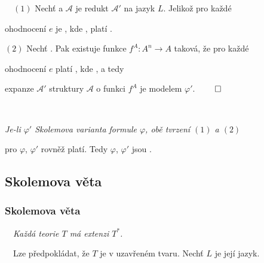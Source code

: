 {\it {}}\ \ $(1)$ Nechť  a $\mathcal{A}$ je redukt $\mathcal{A}'$ na jazyk $L$. Jelikož pro každé
\smallskip

ohodnocení $e$ je , kde , platí .
\smallskip

$(2)$ Nechť . Pak existuje funkce $f^{A}\colon A^n \to A$ taková, že pro každé
\smallskip

ohodnocení $e$ platí , kde , a tedy
\smallskip

expanze $\mathcal{A'}$ struktury $\mathcal{A}$ o funkci $f^{A}$ je modelem $\varphi'$. $\qed$
\medskip

{\bf {}}\ \ {\it Je-li $\varphi'$ Skolemova varianta formule $\varphi$, obě tvrzení $(1)$ a $(2)$
\smallskip

pro $\varphi$, $\varphi'$ rovněž platí. Tedy $\varphi$, $\varphi'$ jsou .}



\subsection{Skolemova věta}\todo

\subsubsection*{Skolemova věta}
    
    {\bf {}}\ \ {\it Každá teorie $T$ má  extenzi $T^*$.}
    \medskip
    
    {\it {}}\ \ Lze předpokládat, že $T$ je v uzavřeném tvaru. Nechť $L$ je její jazyk.
    \vspace{0.5mm}
    

